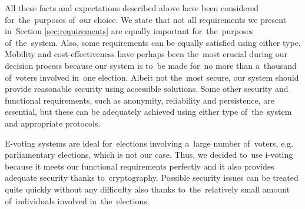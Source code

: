All these facts and expectations described above have been considered for~the~purposes of~our choice. We state that not all requirements we present in~Section \ref{sec:requirements} are equally important for~the~purposes of~the~system. Also, some requirements can be equally satisfied using either type. Mobility and cost-effectiveness have perhaps been the~most crucial during our decision process because our system is to~be made for~no more than a~thousand of~voters involved in~one election. Albeit not the~most secure, our system should provide reasonable security using accessible solutions. Some other security and functional requirements, such as anonymity, reliability and persistence, are essential, but these can be adequately achieved using either type of~the~system and appropriate protocols. 

E-voting systems are ideal for~elections involving a~large number of~voters, e.g. parliamentary elections, which is not our case. Thus, we decided to~use i-voting because it meets our functional requirements perfectly and it also provides adequate security thanks to~cryptography. Possible security issues can be treated quite quickly without any difficulty also thanks to~the~relatively small amount of~individuals involved in~the~elections.






